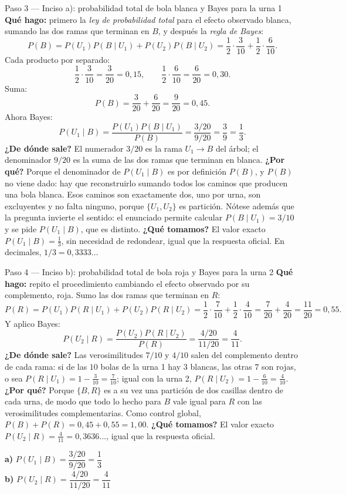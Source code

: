 \documentclass[11pt]{article}
\begin{document}
\begin{sol}
\begin{paso}{Paso 3 --- Inciso a): probabilidad total de bola blanca y Bayes para la urna 1}
\textbf{Qué hago:} primero la \emph{ley de probabilidad total} para el efecto observado blanca, sumando las dos ramas que terminan en $B$, y después la \emph{regla de Bayes}:
\[
P(B)=P(U_1)P(B\mid U_1)+P(U_2)P(B\mid U_2)=\frac12\cdot\frac{3}{10}+\frac12\cdot\frac{6}{10}.
\]
Cada producto por separado:
\[
\frac12\cdot\frac{3}{10}=\frac{3}{20}=0,15,\qquad \frac12\cdot\frac{6}{10}=\frac{6}{20}=0,30 .
\]
Suma:
\[
P(B)=\frac{3}{20}+\frac{6}{20}=\frac{9}{20}=0,45 .
\]
Ahora Bayes:
\[
P(U_1\mid B)=\frac{P(U_1)P(B\mid U_1)}{P(B)}=\frac{3/20}{9/20}=\frac{3}{9}=\frac13 .
\]
\textbf{¿De dónde sale?} El numerador $3/20$ es la rama $U_1\to B$ del árbol; el denominador $9/20$ es la suma de las dos ramas que terminan en blanca.
\textbf{¿Por qué?} Porque el denominador de $P(U_1\mid B)$ es por definición $P(B)$, y $P(B)$ no viene dado: hay que reconstruirlo sumando todos los caminos que producen una bola blanca. Esos caminos son exactamente dos, uno por urna, son excluyentes y no falta ninguno, porque $\{U_1,U_2\}$ es partición. Nótese además que la pregunta invierte el sentido: el enunciado permite calcular $P(B\mid U_1)=3/10$ y se pide $P(U_1\mid B)$, que es distinto.
\textbf{¿Qué tomamos?} El valor exacto $P(U_1\mid B)=\tfrac13$, sin necesidad de redondear, igual que la respuesta oficial. En decimales, $1/3=0,3333\ldots$
\end{paso}

\begin{paso}{Paso 4 --- Inciso b): probabilidad total de bola roja y Bayes para la urna 2}
\textbf{Qué hago:} repito el procedimiento cambiando el efecto observado por su complemento, roja. Sumo las dos ramas que terminan en $R$:
\[
P(R)=P(U_1)P(R\mid U_1)+P(U_2)P(R\mid U_2)=\frac12\cdot\frac{7}{10}+\frac12\cdot\frac{4}{10}
=\frac{7}{20}+\frac{4}{20}=\frac{11}{20}=0,55 .
\]
Y aplico Bayes:
\[
P(U_2\mid R)=\frac{P(U_2)P(R\mid U_2)}{P(R)}=\frac{4/20}{11/20}=\frac{4}{11}.
\]
\textbf{¿De dónde sale?} Las verosimilitudes $7/10$ y $4/10$ salen del complemento dentro de cada rama: si de las $10$ bolas de la urna 1 hay $3$ blancas, las otras $7$ son rojas, o sea $P(R\mid U_1)=1-\tfrac{3}{10}=\tfrac{7}{10}$; igual con la urna 2, $P(R\mid U_2)=1-\tfrac{6}{10}=\tfrac{4}{10}$.
\textbf{¿Por qué?} Porque $\{B,R\}$ es a su vez una partición de dos casillas dentro de cada urna, de modo que todo lo hecho para $B$ vale igual para $R$ con las verosimilitudes complementarias. Como control global, $P(B)+P(R)=0,45+0,55=1,00$.
\textbf{¿Qué tomamos?} El valor exacto $P(U_2\mid R)=\tfrac{4}{11}=0,3636\ldots$, igual que la respuesta oficial.
\end{paso}

\begin{resp}
\textbf{a)} $P(U_1\mid B)=\dfrac{3/20}{9/20}=\dfrac13$\\
\textbf{b)} $P(U_2\mid R)=\dfrac{4/20}{11/20}=\dfrac{4}{11}$
\end{resp}

\end{sol}
\end{document}
